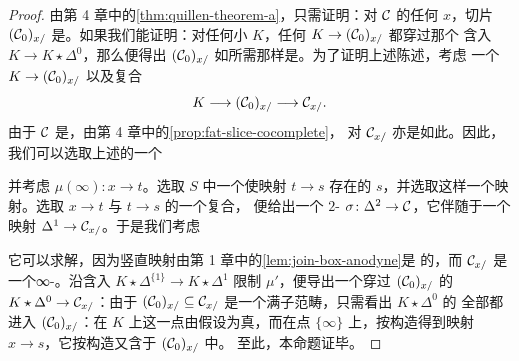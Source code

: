\begin{proof}
由第 4 章中的\cref{thm:quillen-theorem-a}，只需证明：对 $\mathcal{C}$ 的任何\trObject{}%
$x$，切片 $(\mathcal{C}_0)_{x/}$ 是\trWeaklyContractible{}。如果我们能证明：对任何小%
\trSimplicialSet{} $K$，任何\trFunctor{} $K \to (\mathcal{C}_0)_{x/}$ 都穿过那个%
\trContractible{}含入 $K \to K \star \Delta^0$，那么便得出
$(\mathcal{C}_0)_{x/}$ 如所需那样是\trWeaklyContractible{}。为了证明上述陈述，考虑
一个\trFunctor{} $K \to (\mathcal{C}_0)_{x/}$ 以及复合
\[
K \longrightarrow (\mathcal{C}_0)_{x/} \longrightarrow \mathcal{C}_{x/}.
\]
由于 $\mathcal{C}$ 是\trCocomplete{}，由第 4 章中的\cref{prop:fat-slice-cocomplete}，
对 $\mathcal{C}_{x/}$ 亦是如此。因此，我们可以选取上述\trFunctor{}的一个\trColimit{}%
\trCone{}%
\begin{center}
\end{center}
并考虑 $\mu(\infty)\colon x \to t$。选取 $S$ 中一个使映射 $t \to s$ 存在的%
\trObject{} $s$，并选取这样一个映射。选取 $x \to t$ 与 $t \to s$ 的一个复合，
便给出一个 $2$-\trSimplex{} $\sigma\colon \Delta^2 \to \mathcal{C}$，它伴随于一个映射
$\Delta^1 \to \mathcal{C}_{x/}$。于是我们考虑\trLiftingProblem{}%
\begin{center}
\end{center}
它可以求解，因为竖直映射由第 1 章中的\cref{lem:join-box-anodyne}是%
\trInnerAnodyne{}的，而 $\mathcal{C}_{x/}$ 是一个∞-\trCategory{}。沿含入
$K \star \Delta^{\{1\}} \to K \star \Delta^1$ 限制 $\mu'$，便导出一个穿过
$(\mathcal{C}_0)_{x/}$ 的\trFunctor{} $K \star \Delta^0 \to \mathcal{C}_{x/}$：由于
$(\mathcal{C}_0)_{x/} \subseteq \mathcal{C}_{x/}$ 是一个满子范畴，只需看出 $K \star \Delta^0$ 的
全部\trObject{}都进入 $(\mathcal{C}_0)_{x/}$：在 $K$ 上这一点由假设为真，而在\trCone{}点
$\{\infty\}$ 上，按构造得到映射 $x \to s$，它按构造又含于 $(\mathcal{C}_0)_{x/}$ 中。
至此，本命题证毕。
\end{proof}

